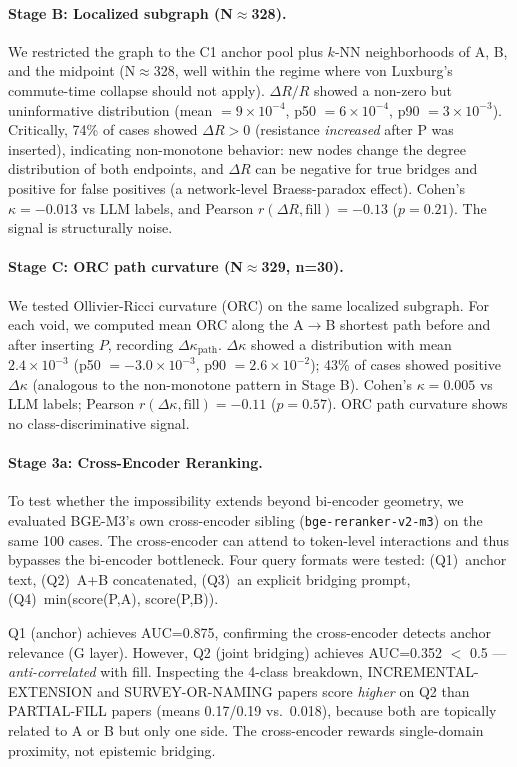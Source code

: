 \documentclass[11pt,twocolumn]{article}
\begin{document}
\paragraph{Stage B: Localized subgraph (N$\approx$328).}
We restricted the graph to the C1 anchor pool plus $k$-NN neighborhoods of A, B,
and the midpoint (N$\approx$328, well within the regime where von Luxburg's
commute-time collapse should not apply).
$\Delta R/R$ showed a non-zero but uninformative distribution
(mean $= 9 \times 10^{-4}$, p50 $= 6 \times 10^{-4}$, p90 $= 3 \times 10^{-3}$).
Critically, 74\% of cases showed $\Delta R > 0$ (resistance \emph{increased}
after P was inserted), indicating non-monotone behavior: new nodes change the
degree distribution of both endpoints, and $\Delta R$ can be negative for true
bridges and positive for false positives (a network-level Braess-paradox effect).
Cohen's $\kappa = -0.013$ vs LLM labels, and Pearson $r(\Delta R, \mathrm{fill}) = -0.13$
($p = 0.21$). The signal is structurally noise.

\paragraph{Stage C: ORC path curvature (N$\approx$329, n=30).}
We tested Ollivier-Ricci curvature (ORC) on the same localized subgraph.
For each void, we computed mean ORC along the A$\to$B shortest path before and after
inserting $P$, recording $\Delta\kappa_\mathrm{path}$.
$\Delta\kappa$ showed a distribution with mean $2.4\times10^{-3}$ (p50 $=-3.0\times10^{-3}$,
p90 $=2.6\times10^{-2}$); 43\% of cases showed positive $\Delta\kappa$ (analogous to
the non-monotone pattern in Stage B).
Cohen's $\kappa = 0.005$ vs LLM labels; Pearson $r(\Delta\kappa, \mathrm{fill}) = -0.11$
($p = 0.57$). ORC path curvature shows no class-discriminative signal.

\paragraph{Stage 3a: Cross-Encoder Reranking.}
To test whether the impossibility extends beyond bi-encoder geometry, we evaluated
BGE-M3's own cross-encoder sibling (\texttt{bge-reranker-v2-m3}) on the same 100 cases.
The cross-encoder can attend to token-level interactions and thus bypasses the
bi-encoder bottleneck. Four query formats were tested: (Q1)~anchor text, (Q2)~A+B
concatenated, (Q3)~an explicit bridging prompt, (Q4)~min(score(P,A), score(P,B)).

Q1 (anchor) achieves AUC=0.875, confirming the cross-encoder detects anchor
relevance (G layer). However, Q2 (joint bridging) achieves AUC=0.352 $<$ 0.5 ---
\emph{anti-correlated} with fill. Inspecting the 4-class breakdown, INCREMENTAL-EXTENSION
and SURVEY-OR-NAMING papers score \emph{higher} on Q2 than PARTIAL-FILL papers
(means 0.17/0.19 vs.\ 0.018), because both are topically related to A or B but only
one side. The cross-encoder rewards single-domain proximity, not epistemic bridging.
\end{document}
